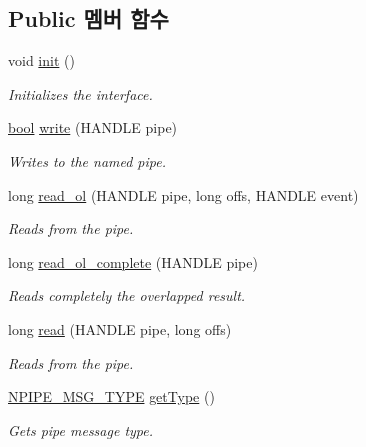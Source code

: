 \subsection*{Public 멤버 함수}
\begin{DoxyCompactItemize}
\item 
void \hyperlink{class_windows_n_pipe_message_a02fd73d861ef2e4aabb38c0c9ff82947}{init} ()
\begin{DoxyCompactList}\small\item\em Initializes the interface. \end{DoxyCompactList}\item 
\hyperlink{avb__gptp_8h_af6a258d8f3ee5206d682d799316314b1}{bool} \hyperlink{class_windows_n_pipe_message_a1a6e0ed523a40350e1e0c44510d9caab}{write} (H\+A\+N\+D\+LE pipe)
\begin{DoxyCompactList}\small\item\em Writes to the named pipe. \end{DoxyCompactList}\item 
long \hyperlink{class_windows_n_pipe_message_a25ac1b47d55092db7e7204a83f6d3367}{read\+\_\+ol} (H\+A\+N\+D\+LE pipe, long offs, H\+A\+N\+D\+LE event)
\begin{DoxyCompactList}\small\item\em Reads from the pipe. \end{DoxyCompactList}\item 
long \hyperlink{class_windows_n_pipe_message_ad65e923c3adebfc9ff97d89007bf5633}{read\+\_\+ol\+\_\+complete} (H\+A\+N\+D\+LE pipe)
\begin{DoxyCompactList}\small\item\em Reads completely the overlapped result. \end{DoxyCompactList}\item 
long \hyperlink{class_windows_n_pipe_message_aefaf53a62a09b658795b4bff415c8c68}{read} (H\+A\+N\+D\+LE pipe, long offs)
\begin{DoxyCompactList}\small\item\em Reads from the pipe. \end{DoxyCompactList}\item 
\hyperlink{windows__ipc_8hpp_a5a7d5ebd4af251aa73a4afcce1dc68a1}{N\+P\+I\+P\+E\+\_\+\+M\+S\+G\+\_\+\+T\+Y\+PE} \hyperlink{class_windows_n_pipe_message_a7bafd143bb174fae7ef70730c8469f1c}{get\+Type} ()
\begin{DoxyCompactList}\small\item\em Gets pipe message type. \end{DoxyCompactList}\end{DoxyCompactItemize}

